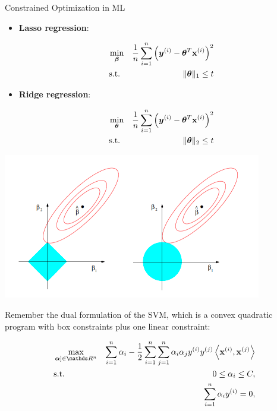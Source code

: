 \documentclass[11pt,compress,t,notes=noshow, xcolor=table]{beamer}
\begin{document}
\begin{vbframe}{Constrained Optimization in ML}

\begin{itemize}
\item \textbf{Lasso regression}:

\begin{eqnarray*}
\min_{\bm{\beta}} && \frac{1}{n}\sum_{i = 1}^n\left(\bm{y}^{(i)} - \bm{\theta}^T\mathbf{x}^{(i)}\right)^2 \\
\text{s.t. } && \|\bm{\theta}\|_1 \le t
\end{eqnarray*}

\item \textbf{Ridge regression}:

\begin{eqnarray*}
\min_{\bm{\theta}} && \frac{1}{n}\sum_{i = 1}^n\left(\bm{y}^{(i)} - \bm{\theta}^T\mathbf{x}^{(i)}\right)^2 \\
\text{s.t. } &&\|\bm{\theta}\|_2 \le t
\end{eqnarray*}
\end{itemize}

\begin{center}
	\includegraphics{figure_man/lasso-ridge.png}
\end{center}

\framebreak

Remember the dual formulation of the SVM, which is a convex quadratic program with box constraints plus one linear constraint: 

\begin{eqnarray*}
	& \max\limits_{\boldsymbol{\alpha}] \in \R^n} & \sum_{i=1}^n \alpha_i - \frac{1}{2}\sum_{i=1}^n\sum_{j=1}^n\alpha_i\alpha_j\yi y^{(j)} \scp{\xi}{\xv^{(j)}} \\
	& \text{s.t. } & 0 \le \alpha_i \le C, \\
	& \quad & \sum_{i=1}^n \alpha_i \yi = 0,
\end{eqnarray*}


\end{vbframe}
\end{document}
